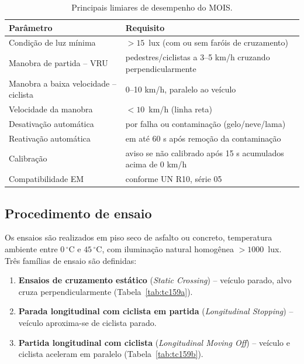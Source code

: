 \documentclass[11pt,a4paper]{article}
\begin{document}
\begin{table}[H]
\centering
\caption{Principais limiares de desempenho do MOIS.}
\label{tab:perf159}
\small
\begin{tabularx}{\linewidth}{@{}lX@{}}
\toprule
\textbf{Parâmetro} & \textbf{Requisito} \\
\midrule
Condição de luz mínima & $>15$~lux (com ou sem faróis de cruzamento) \\
Manobra de partida -- VRU & pedestres/ciclistas a 3--5 km/h cruzando
perpendicularmente \\
Manobra a baixa velocidade -- ciclista & 0--10 km/h, paralelo ao veículo \\
Velocidade da manobra & $<10$~km/h (linha reta) \\
Desativação automática & por falha ou contaminação (gelo/neve/lama) \\
Reativação automática & em até 60 s após remoção da contaminação \\
Calibração & aviso se não calibrado após 15 s acumulados acima de 0 km/h \\
Compatibilidade EM & conforme UN R10, série 05 \\
\bottomrule
\end{tabularx}
\end{table}

\subsection{Procedimento de ensaio}

Os ensaios são realizados em piso seco de asfalto ou concreto, temperatura
ambiente entre $0\,^{\circ}$C e $45\,^{\circ}$C, com iluminação natural
homogênea $>1000$~lux. Três famílias de ensaio são definidas:

\begin{enumerate}[leftmargin=1.5em,itemsep=2pt]
  \item \textbf{Ensaios de cruzamento estático} (\emph{Static Crossing}) --
        veículo parado, alvo cruza perpendicularmente (Tabela~\ref{tab:tc159a}).
  \item \textbf{Parada longitudinal com ciclista em partida}
        (\emph{Longitudinal Stopping}) -- veículo aproxima-se de ciclista parado.
  \item \textbf{Partida longitudinal com ciclista} (\emph{Longitudinal Moving
        Off}) -- veículo e ciclista aceleram em paralelo (Tabela~\ref{tab:tc159b}).
\end{enumerate}
\end{document}
